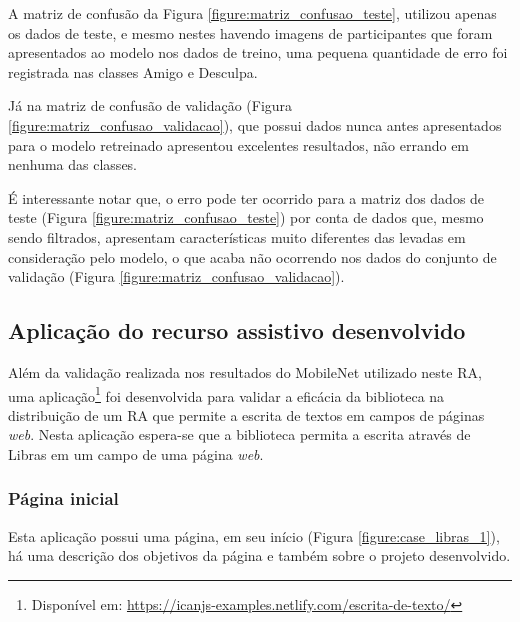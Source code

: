 \par A matriz de confusão da Figura \ref{figure:matriz_confusao_teste}, utilizou apenas os dados de teste, e mesmo nestes havendo imagens de participantes que foram apresentados ao modelo nos dados de treino, uma pequena quantidade de erro foi registrada nas classes Amigo e Desculpa.


\par Já na matriz de confusão de validação (Figura \ref{figure:matriz_confusao_validacao}), que possui dados nunca antes apresentados para o modelo retreinado apresentou excelentes resultados, não errando em nenhuma das classes.


\par É interessante notar que, o erro pode ter ocorrido para a matriz dos dados de teste (Figura \ref{figure:matriz_confusao_teste}) por conta de dados que, mesmo sendo filtrados, apresentam características muito diferentes das levadas em consideração pelo modelo, o que acaba não ocorrendo nos dados do conjunto de validação (Figura \ref{figure:matriz_confusao_validacao}).

\subsection{Aplicação do recurso assistivo desenvolvido}

\par Além da validação realizada nos resultados do MobileNet utilizado neste RA, uma aplicação\footnote{Disponível em: \url{https://icanjs-examples.netlify.com/escrita-de-texto/}} foi desenvolvida para validar a eficácia da biblioteca na distribuição de um RA que permite a escrita de textos em campos de páginas \textit{web}. Nesta aplicação espera-se que a biblioteca permita a escrita através de Libras em um campo de uma página \textit{web}.

\subsubsection{Página inicial}

\par Esta aplicação possui uma página, em seu início (Figura \ref{figure:case_libras_1}), há uma descrição dos objetivos da página e também sobre o projeto desenvolvido.

